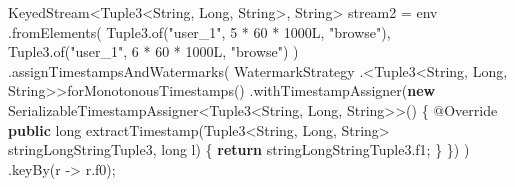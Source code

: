 \documentclass[cn,11pt,chinese]{elegantbook}
\newenvironment{Shaded}{}{}
\newcommand{\AttributeTok}[1]{\textcolor[rgb]{0.49,0.56,0.16}{#1}}
\newcommand{\BuiltInTok}[1]{#1}
\newcommand{\DataTypeTok}[1]{\textcolor[rgb]{0.56,0.13,0.00}{#1}}
\newcommand{\DecValTok}[1]{\textcolor[rgb]{0.25,0.63,0.44}{#1}}
\newcommand{\FunctionTok}[1]{\textcolor[rgb]{0.02,0.16,0.49}{#1}}
\newcommand{\KeywordTok}[1]{\textcolor[rgb]{0.00,0.44,0.13}{\textbf{#1}}}
\newcommand{\NormalTok}[1]{#1}
\newcommand{\StringTok}[1]{\textcolor[rgb]{0.25,0.44,0.63}{#1}}
\begin{document}
\begin{Shaded}
\begin{Highlighting}[]
\NormalTok{        KeyedStream\textless{}Tuple3\textless{}}\BuiltInTok{String}\NormalTok{, }\BuiltInTok{Long}\NormalTok{, }\BuiltInTok{String}\NormalTok{\textgreater{}, }\BuiltInTok{String}\NormalTok{\textgreater{} stream2 = env}
\NormalTok{            .}\FunctionTok{fromElements}\NormalTok{(}
\NormalTok{                Tuple3.}\FunctionTok{of}\NormalTok{(}\StringTok{"user\_1"}\NormalTok{, }\DecValTok{5}\NormalTok{ * }\DecValTok{60}\NormalTok{ * }\DecValTok{1000L}\NormalTok{, }\StringTok{"browse"}\NormalTok{),}
\NormalTok{                Tuple3.}\FunctionTok{of}\NormalTok{(}\StringTok{"user\_1"}\NormalTok{, }\DecValTok{6}\NormalTok{ * }\DecValTok{60}\NormalTok{ * }\DecValTok{1000L}\NormalTok{, }\StringTok{"browse"}\NormalTok{)}
\NormalTok{            )}
\NormalTok{            .}\FunctionTok{assignTimestampsAndWatermarks}\NormalTok{(}
\NormalTok{                WatermarkStrategy}
\NormalTok{                    .\textless{}Tuple3\textless{}}\BuiltInTok{String}\NormalTok{, }\BuiltInTok{Long}\NormalTok{, }\BuiltInTok{String}\NormalTok{\textgreater{}\textgreater{}}\FunctionTok{forMonotonousTimestamps}\NormalTok{()}
\NormalTok{                    .}\FunctionTok{withTimestampAssigner}\NormalTok{(}\KeywordTok{new}\NormalTok{ SerializableTimestampAssigner\textless{}Tuple3\textless{}}\BuiltInTok{String}\NormalTok{, }\BuiltInTok{Long}\NormalTok{, }\BuiltInTok{String}\NormalTok{\textgreater{}\textgreater{}() \{}
                        \AttributeTok{@Override}
                        \KeywordTok{public} \DataTypeTok{long} \FunctionTok{extractTimestamp}\NormalTok{(Tuple3\textless{}}\BuiltInTok{String}\NormalTok{, }\BuiltInTok{Long}\NormalTok{, }\BuiltInTok{String}\NormalTok{\textgreater{} stringLongStringTuple3, }\DataTypeTok{long}\NormalTok{ l) \{}
                            \KeywordTok{return}\NormalTok{ stringLongStringTuple3.}\FunctionTok{f1}\NormalTok{;}
\NormalTok{                        \}}
\NormalTok{                    \})}
\NormalTok{            )}
\NormalTok{            .}\FunctionTok{keyBy}\NormalTok{(r {-}\textgreater{} r.}\FunctionTok{f0}\NormalTok{);}


\end{Highlighting}
\end{Shaded}
\end{document}
